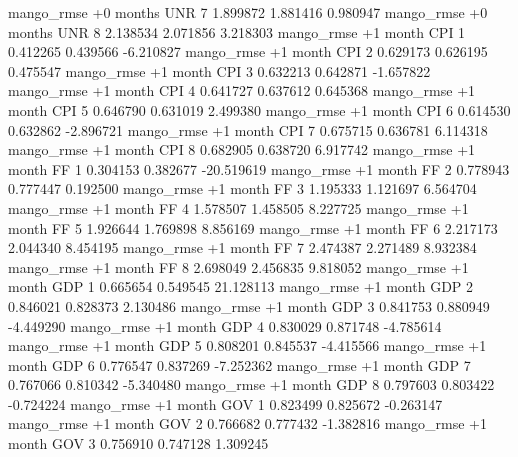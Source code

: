 mango_rmse +0 months      UNR                 7 1.899872       1.881416           0.980947
mango_rmse +0 months      UNR                 8 2.138534       2.071856           3.218303
mango_rmse  +1 month      CPI                 1 0.412265       0.439566          -6.210827
mango_rmse  +1 month      CPI                 2 0.629173       0.626195           0.475547
mango_rmse  +1 month      CPI                 3 0.632213       0.642871          -1.657822
mango_rmse  +1 month      CPI                 4 0.641727       0.637612           0.645368
mango_rmse  +1 month      CPI                 5 0.646790       0.631019           2.499380
mango_rmse  +1 month      CPI                 6 0.614530       0.632862          -2.896721
mango_rmse  +1 month      CPI                 7 0.675715       0.636781           6.114318
mango_rmse  +1 month      CPI                 8 0.682905       0.638720           6.917742
mango_rmse  +1 month       FF                 1 0.304153       0.382677         -20.519619
mango_rmse  +1 month       FF                 2 0.778943       0.777447           0.192500
mango_rmse  +1 month       FF                 3 1.195333       1.121697           6.564704
mango_rmse  +1 month       FF                 4 1.578507       1.458505           8.227725
mango_rmse  +1 month       FF                 5 1.926644       1.769898           8.856169
mango_rmse  +1 month       FF                 6 2.217173       2.044340           8.454195
mango_rmse  +1 month       FF                 7 2.474387       2.271489           8.932384
mango_rmse  +1 month       FF                 8 2.698049       2.456835           9.818052
mango_rmse  +1 month      GDP                 1 0.665654       0.549545          21.128113
mango_rmse  +1 month      GDP                 2 0.846021       0.828373           2.130486
mango_rmse  +1 month      GDP                 3 0.841753       0.880949          -4.449290
mango_rmse  +1 month      GDP                 4 0.830029       0.871748          -4.785614
mango_rmse  +1 month      GDP                 5 0.808201       0.845537          -4.415566
mango_rmse  +1 month      GDP                 6 0.776547       0.837269          -7.252362
mango_rmse  +1 month      GDP                 7 0.767066       0.810342          -5.340480
mango_rmse  +1 month      GDP                 8 0.797603       0.803422          -0.724224
mango_rmse  +1 month      GOV                 1 0.823499       0.825672          -0.263147
mango_rmse  +1 month      GOV                 2 0.766682       0.777432          -1.382816
mango_rmse  +1 month      GOV                 3 0.756910       0.747128           1.309245
